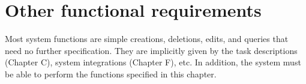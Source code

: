 \documentclass[Main]{subfiles}
\begin{document}
\chapter{Other functional requirements}
Most system functions are simple creations, deletions, edits, and queries that need no further specification. They are implicitly given by the task descriptions (Chapter C), system integrations (Chapter F), etc. In addition, the system must be able to perform the functions specified in this chapter.


%

%
\end{document}
